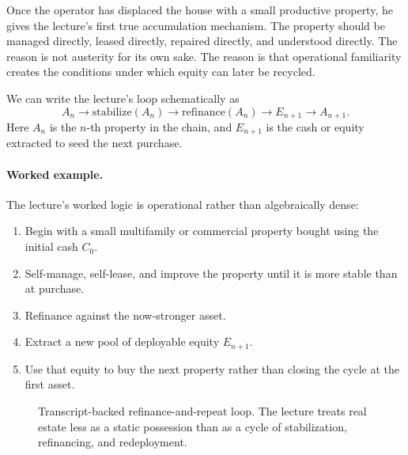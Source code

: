 Once the operator has displaced the house with a small productive property, he gives the lecture's first true accumulation mechanism. The property should be managed directly, leased directly, repaired directly, and understood directly. The reason is not austerity for its own sake. The reason is that operational familiarity creates the conditions under which equity can later be recycled.

We can write the lecture's loop schematically as
\begin{equation}
A_n \to \text{stabilize}(A_n) \to \text{refinance}(A_n) \to E_{n+1} \to A_{n+1}.
\end{equation}
Here \(A_n\) is the \(n\)-th property in the chain, and \(E_{n+1}\) is the cash or equity extracted to seed the next purchase.

\paragraph{Worked example.}
The lecture's worked logic is operational rather than algebraically dense:
\begin{enumerate}
\item Begin with a small multifamily or commercial property bought using the initial cash \(C_0\).
\item Self-manage, self-lease, and improve the property until it is more stable than at purchase.
\item Refinance against the now-stronger asset.
\item Extract a new pool of deployable equity \(E_{n+1}\).
\item Use that equity to buy the next property rather than closing the cycle at the first asset.
\end{enumerate}

\begin{figure}[h]
\centering
{}
\caption{Transcript-backed refinance-and-repeat loop. The lecture treats real estate less as a static possession than as a cycle of stabilization, refinancing, and redeployment.}
\end{figure}

